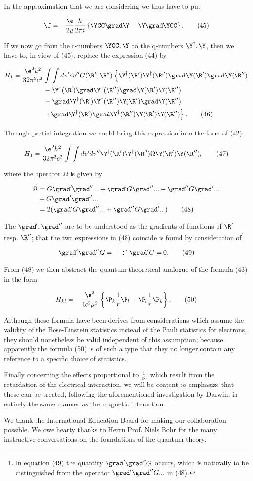 \documentclass{article}
\newcommand{\nequ}[2]{
\begin{align*}
#1
\tag{#2}
\end{align*}
}
\begin{document}
In the approximation that we are considering we thus have to put
\nequ{
\J = -\frac{\e}{2\mu}\frac{h}{2\pi i}\left\{\YCC\grad\Y - \Y\grad\YCC \right\}.
}{45}
If we now go from the c-numbers $\YCC,\Y$ to the q-numbers $\Y^{\dagger},\Y$, then we have to, in view of (45), replace the expression (44) by
\nequ{
H_1 = \frac{\e^2 h^2}{32\pi^2 c^2} & \int\int dv' dv'' G(\R',\R'')\left\{
\Y^\dagger(\R')\Y^\dagger(\R'')\grad\Y(\R')\grad\Y(\R'')\right.\\
 &- \Y^\dagger(\R')\grad\Y^\dagger(\R'')\grad\Y(\R')\Y(\R'')\\
 &- \grad\Y^\dagger(\R')\Y^\dagger(\R'')\Y(\R')\grad\Y(\R'')\\
 &\left.
 + \grad\Y^\dagger(\R')\grad\Y^\dagger(\R'')\Y(\R')\Y(\R'')
\right\}.
}{46}
Through partial integration we could bring this expression into the form of (42):
\nequ{
H_1 = \frac{\e^2 h^2}{32\pi^2 c^2}\int\int dv' dv''
      \Y^\dagger(\R')\Y^\dagger(\R'')\Omega\Y(\R')\Y(\R''),
}{47}
where the operator $\Omega$ is given by
\nequ{
\Omega &= G \grad'\grad''... + \grad'G\grad'' ... + \grad'' G\grad' ...\\
       &+ G \grad'\grad''...\\
       &= 2(\grad' G \grad'' ... + \grad'' G \grad'...)
}{48}
The $\grad',\grad''$ are to be understood as the gradients of functions of $\R'$ resp. $\R''$; that the two expressions in (48) coincide is found by consideration of\footnote{In equation (49) the quantity $\grad'\grad'' G$ occurs, which is naturally to be distinguished from the operator $\grad'\grad'' G...$ in (48).}
\nequ{
\grad'\grad'' G = -\div'\grad' G = 0.
}{49}

From (48) we then abstract the quantum-theoretical analogue of the formula (43) in the form
\nequ{
H_{kl} = -\frac{\e^2}{4 c^2 \mu^2}\left\{\P_k\frac{1}{r}\P_l + \P_l\frac{1}{r}\P_k\right\}.
}{50}

Although these formula have been derives from considerations which assume the validity of the Bose-Einstein statistics instead of the Pauli statistics for electrons, they should nonetheless be valid independent of this assumption; because apparently the formula (50) is of such a type that they no longer contain any reference to a specific choice of statistics.

Finally concerning the effects proportional to $\frac{1}{c^2}$, which result from the retardation of the electrical interaction, we will be content to emphasize that these can be treated, following the aforementioned investigation by Darwin, in entirely the same manner as the magnetic interaction.

We thank the International Education Board for making our collaboration possible. We owe hearty thanks to Herrn Prof. Niels Bohr for the many instructive conversations on the foundations of the quantum theory.
\end{document}
